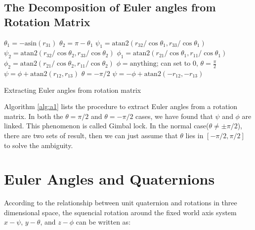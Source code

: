 \documentclass{article}
\begin{document}
\subsection{The Decomposition of Euler angles from Rotation Matrix}
\begin{center}\begin{minipage}[c]{0.7\linewidth}
\begin{algorithm}[H]
\begin{algorithmic}
    \STATE $\theta_1 = −\text{asin}(r_{31})$
    \STATE $\theta_2 = \pi − \theta_1$
    \STATE $\psi_1 = \text{atan2}(r_{32}/\cos{\theta_1}, r_{33}/\cos{\theta_1})$
    \STATE $\psi_2 = \text{atan2}(r_{32}/\cos{\theta_2}, r_{33}/\cos{\theta_2})$
    \STATE $\phi_1 = \text{atan2}(r_{21}/\cos{\theta_1}, r_{11}/\cos{\theta_1})$
    \STATE $\phi_2 = \text{atan2}(r_{21}/\cos{\theta_2}, r_{11}/\cos{\theta_2})$
  \ELSE
    \STATE $\phi = \text{anything}$; can set to 0,
      \STATE $\theta = \frac{\pi}{2}$
      \STATE $\psi = \phi + \text{atan2}(r_{12}, r_{13})$
    \ELSE
      \STATE $\theta = −\pi/2$
      \STATE $\psi = −\phi + \text{atan2}(−r_{12}, −r_{13})$
    \ENDIF
  \ENDIF
\end{algorithmic}
\caption{Extracting Euler angles from rotation matrix}
\label{alg:a1}
\end{algorithm}
\end{minipage}
\end{center}

Algorithm \ref{alg:a1} lists the procedure to extract Euler angles from a rotation matrix. In both the $\theta=\pi/2$ and $\theta=−\pi/2$ cases, we have found that $\psi$ and $\phi$ are linked. This phenomenon is called Gimbal lock. In the normal case($\theta \ne \pm \pi/2$), there are two sets of result, then we can just assume that $\theta$ lies in $[-\pi/2, \pi/2]$ to solve the ambiguity.


\section{Euler Angles and Quaternions}

According to the relationship between unit quaternion and rotations in three dimensional space, the squencial rotation around the fixed world axis system $x-\psi$, $y-\theta$, and $z-\phi$ can be written as:
\end{document}
